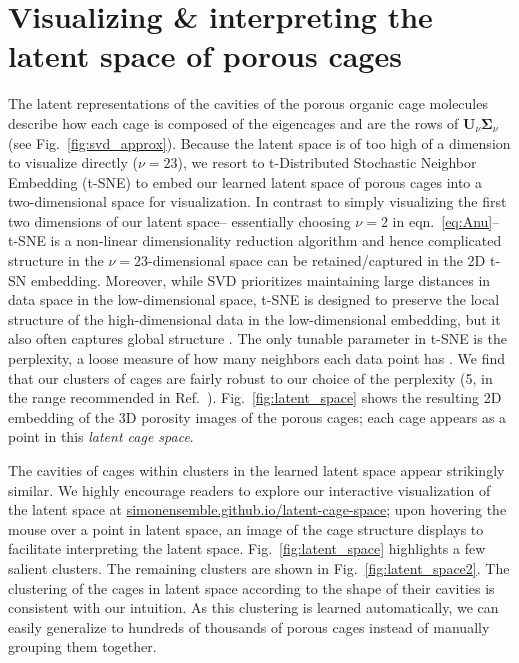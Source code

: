 \documentclass[journal=jacsat,manuscript=article,layout=traditional]{achemso}
\begin{document}
\section{Visualizing \& interpreting the latent space of porous cages} 
The latent representations of the cavities of the porous organic cage molecules describe how each cage is composed of the eigencages and are the rows of $\mathbf{U}_\nu \mathbf{\Sigma}_\nu$ (see Fig.~\ref{fig:svd_approx}). {\color{red} Because the latent space is of too high of a dimension to visualize directly ($\nu=23$), we resort to t-Distributed Stochastic Neighbor Embedding (t-SNE) \cite{maaten2008visualizing,wattenberg2016how} to embed our learned latent space of porous cages into a two-dimensional space for visualization. 
In contrast to simply visualizing the first two dimensions of our latent space-- essentially choosing $\nu=2$ in eqn.~\ref{eq:Anu}-- t-SNE is a non-linear dimensionality reduction algorithm and hence complicated structure in the $\nu=23$-dimensional space can be retained/captured in the 2D t-SN embedding. Moreover, while  SVD prioritizes maintaining large distances in data space in the low-dimensional space, t-SNE is designed to preserve the local structure of the high-dimensional data in the low-dimensional embedding, but it also often captures global structure \cite{maaten2008visualizing}. 
The only tunable parameter in t-SNE is the perplexity, a loose measure of how many neighbors each data point has \cite{maaten2008visualizing,wattenberg2016how}. We find that our clusters of cages are fairly robust to our choice of the perplexity (5, in the range recommended in Ref.~\cite{maaten2008visualizing}).
} Fig.~\ref{fig:latent_space} shows the resulting 2D embedding of the 3D porosity images of the porous cages; each cage appears as a point in this \emph{latent cage space}.

The cavities of cages within clusters in the learned latent space appear strikingly similar.
We highly encourage readers to explore our interactive visualization of the latent space at \url{simonensemble.github.io/latent-cage-space}; upon hovering the mouse over a point in latent space, an image of the cage structure displays to facilitate interpreting the latent space. Fig.~\ref{fig:latent_space} highlights a few salient clusters. The remaining clusters are shown in Fig.~\ref{fig:latent_space2}. The clustering of the cages in latent space according to the shape of their cavities is consistent with our intuition. As this clustering is learned automatically, we can easily generalize to hundreds of thousands of porous cages instead of manually grouping them together. 
\end{document}
